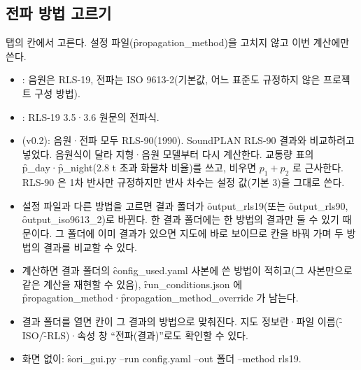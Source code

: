 \documentclass[10.5pt,a4paper]{article}
\begin{document}
\subsection{전파 방법 고르기}\label{sec:method}
 탭의  칸에서 고른다. 설정 파일(\f{propagation\_method})을 고치지 않고 이번 계산에만 쓴다.
\begin{itemize}
\item {}: 음원은 RLS-19, 전파는 ISO 9613-2(기본값, 어느 표준도 규정하지 않은 프로젝트 구성 방법).
\item {}: RLS-19 3.5·3.6 원문의 전파식.
\item {}(v0.2): 음원·전파 모두 RLS-90(1990). SoundPLAN RLS-90 결과와 비교하려고 넣었다. 음원식이 달라 지형·음원 모델부터 다시 계산한다. 교통량 표의 \f{p\_day}·\f{p\_night}(2.8 t 초과 화물차 비율)를 쓰고, 비우면 $p_1 + p_2$ 로 근사한다. RLS-90 은 1차 반사만 규정하지만 반사 차수는 설정 값(기본 3)을 그대로 쓴다.
\item 설정 파일과 다른 방법을 고르면 결과 폴더가 \f{output\_rls19}(또는 \f{output\_rls90}, \f{output\_iso9613\_2})로 바뀐다. 한 결과 폴더에는 한 방법의 결과만 둘 수 있기 때문이다. 그 폴더에 이미 결과가 있으면 지도에 바로 보이므로 칸을 바꿔 가며 두 방법의 결과를 비교할 수 있다.
\item 계산하면 결과 폴더의 \f{config\_used.yaml} 사본에 쓴 방법이 적히고(그 사본만으로 같은 계산을 재현할 수 있음), \f{run\_conditions.json} 에 \f{propagation\_method}·\f{propagation\_method\_override} 가 남는다.
\item 결과 폴더를 열면 칸이 그 결과의 방법으로 맞춰진다. 지도 정보란·파일 이름(\f{-ISO}/\f{-RLS})·속성 창 ``전파(결과)''로도 확인할 수 있다.
\item 화면 없이: \f{sori\_gui.py --run config.yaml --out 폴더 --method rls19}.
\end{itemize}
\end{document}
